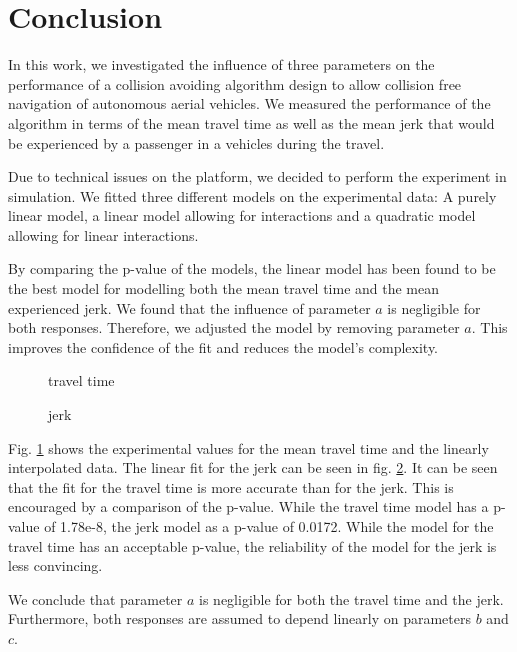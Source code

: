 \section{Conclusion}

In this work, we investigated the influence of three parameters on the performance of a collision avoiding algorithm design to allow collision free navigation of autonomous aerial vehicles. We measured the performance of the algorithm in terms of the mean travel time as well as the mean jerk that would be experienced by a passenger in a vehicles during the travel.

Due to technical issues on the platform, we decided to perform the experiment in simulation.
We fitted three different models on the experimental data: A purely linear model, a linear model allowing for interactions and a quadratic model allowing for linear interactions.

By comparing the p-value of the models, the linear model has been found to be the best model for modelling both the mean travel time and the mean experienced jerk. We found that the influence of parameter $a$ is negligible for both responses. Therefore, we adjusted the model by removing parameter $a$. This improves the confidence of the fit and reduces the model's complexity.

\begin{figure}[h]
	\centering
		\setlength{\figH}{0.23\textwidth}
		
		\caption{travel time}\label{fig:concl_time}
\end{figure}	
\begin{figure}
    		\centering
		\setlength{\figH}{0.23\textwidth}		
		
		\caption{jerk}\label{fig:concl_jerk}
\end{figure}

Fig. \ref{fig:concl_time} shows the experimental values for the mean travel time and the linearly interpolated data. The linear fit for the jerk can be seen in fig. \ref{fig:concl_jerk}. It can be seen that the fit for the travel time is more accurate than for the jerk. This is encouraged by a comparison of the p-value. While the travel time model has a p-value of 1.78e-8, the jerk model as a p-value of 0.0172. While the model for the travel time has an acceptable p-value, the reliability of the model for the jerk is less convincing.

We conclude that parameter $a$ is negligible for both the travel time and the jerk. Furthermore, both responses are assumed to depend linearly on parameters $b$ and $c$.